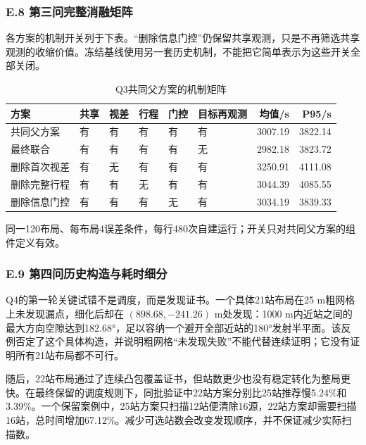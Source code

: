 \documentclass[UTF8,fontset=none,zihao=-4,a4paper]{ctexart}
\begin{document}
\subsubsection{E.8 第三问完整消融矩阵}\label{e.8-ux7b2cux4e09ux95eeux5b8cux6574ux6d88ux878dux77e9ux9635}

各方案的机制开关列于下表。``删除信息门控''仍保留共享观测，只是不再筛选共享观测的收缩价值。冻结基线使用另一套历史机制，不能把它简单表示为这些开关全部关闭。

\begin{table}[H]
\centering\small
\caption{Q3共同父方案的机制矩阵}
\begin{tabular}{@{}llllllrr@{}}
\toprule\noalign{}
方案 & 共享 & 视差 & 行程 & 门控 & 目标再观测 & 均值/s & P95/s \\
\midrule\noalign{}

共同父方案 & 有 & 有 & 有 & 有 & 有 & 3007.19 & 3822.14 \\
最终联合 & 有 & 有 & 有 & 有 & 无 & 2982.18 & 3823.72 \\
删除首次视差 & 有 & 无 & 有 & 有 & 有 & 3250.91 & 4111.08 \\
删除完整行程 & 有 & 有 & 无 & 有 & 有 & 3044.39 & 4085.55 \\
删除信息门控 & 有 & 有 & 有 & 无 & 有 & 3034.19 & 3839.33 \\
\bottomrule
\end{tabular}
\end{table}

同一120布局、每布局4误差条件，每行480次自建运行；开关只对共同父方案的组件定义有效。

\subsubsection{E.9 第四问历史构造与耗时细分}\label{e.9-ux7b2cux56dbux95eeux5386ux53f2ux6784ux9020ux4e0eux8017ux65f6ux7ec6ux5206}

Q4的第一轮关键试错不是调度，而是发现证书。一个具体21站布局在25 m粗网格上未发现漏点，细化后却在 \((898.68,-241.26)\) m处发现：1000 m内近站之间的最大方向空隙达到182.68°，足以容纳一个避开全部近站的180°发射半平面。该反例否定了这个具体构造，并说明粗网格``未发现失败''不能代替连续证明；它没有证明所有21站布局都不可行。

随后，22站布局通过了连续凸包覆盖证书，但站数更少也没有稳定转化为整局更快。在最终保留的调度规则下，同批验证中22站方案分别比25站推荐慢5.24\%和3.39\%。一个保留案例中，25站方案只扫描12站便清除16源，22站方案却需要扫描16站，总时间增加67.12\%。减少可选站数会改变发现顺序，并不保证减少实际扫描数。
\end{document}
